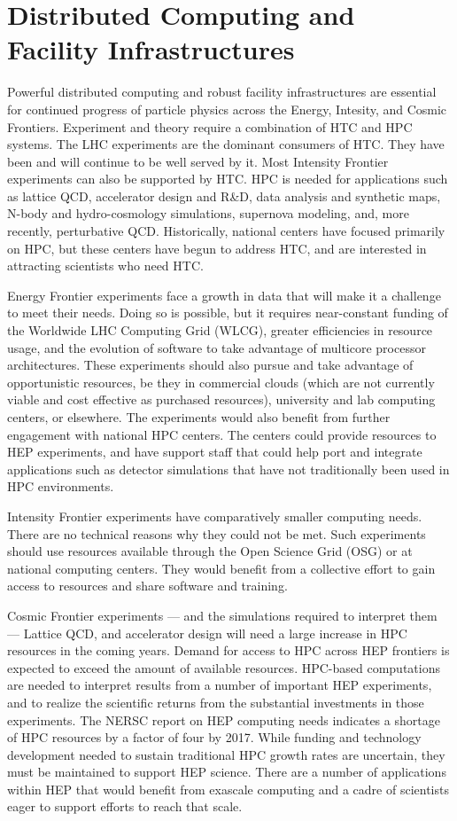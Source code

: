 \section{Distributed Computing and Facility Infrastructures}

Powerful distributed computing and robust facility infrastructures are essential for continued progress of particle physics across the Energy, Intesity, and Cosmic Frontiers.  Experiment and theory require a combination of HTC and HPC systems.  The LHC experiments are the dominant consumers of HTC.  They have been and will continue to be well served by it.  Most Intensity Frontier experiments can also be supported by HTC.  HPC is needed for applications such as lattice QCD, accelerator design and R\&D, data analysis and synthetic maps, N-body and hydro-cosmology simulations, supernova modeling, and, more recently, perturbative QCD.  Historically, national centers have focused primarily on HPC, but these centers have begun to address HTC, and are interested in attracting scientists who need HTC.

Energy Frontier experiments face a growth in data that will make it a challenge to meet their needs.  Doing so is possible, but it requires near-constant funding of the Worldwide LHC Computing Grid (WLCG), greater efficiencies in resource usage, and the evolution of software to take advantage of multicore processor architectures.   These experiments should also pursue and take advantage of opportunistic resources, be they in commercial clouds (which are not currently viable and cost effective as purchased resources), university and lab computing centers, or elsewhere.  The experiments would also benefit from further engagement with national HPC centers.  The centers could provide resources to HEP experiments, and have support staff that could help port and integrate applications such as detector simulations that have not traditionally been used in HPC environments.

Intensity Frontier experiments have comparatively smaller computing needs.  There are no technical reasons why they could not be met.  Such experiments should  use resources available through the Open Science Grid (OSG) or at national computing centers.  They would benefit from a collective effort to gain access to resources and share software and training.

Cosmic Frontier experiments --- and the simulations required to interpret them --- Lattice QCD, and accelerator design will need a large increase in HPC resources in the coming years. Demand for access to HPC across HEP frontiers is expected to exceed the amount of available resources.  HPC-based computations are needed to interpret results from a number of important HEP experiments, and to realize the scientific returns from the substantial investments in those experiments.  The NERSC report on HEP computing needs indicates a shortage of HPC resources by a factor of four by 2017.  While funding and technology development needed to sustain traditional HPC growth rates are uncertain, they must be maintained to support HEP science.  There are a number of applications within HEP that would benefit from exascale computing and a cadre of scientists eager to support efforts to reach that scale.

